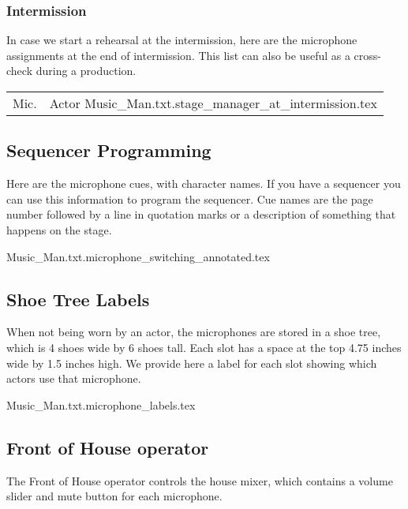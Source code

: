 \documentclass[letterpaper]{article}
\begin{document}
\subsubsection {Intermission}

In case we start a rehearsal at the intermission, here are the microphone
assignments at the end of intermission.  This list can also be useful as a 
cross-check during a production.

\begin{center}
\begin{longtable}{|l|l|}
\hline Mic. & Actor \endhead \hline
 {Music_Man.txt.stage_manager_at_intermission.tex}
\end{longtable}
\end{center}

\subsection {Sequencer Programming}

Here are the microphone cues, with character names.  If you
have a sequencer you can use this information to program
the sequencer.  Cue names are the page number followed by a line
in quotation marks or a description of something that happens on
the stage.

 {Music_Man.txt.microphone_switching_annotated.tex}

\subsection {Shoe Tree Labels}

When not being worn by an actor, the microphones are stored in a shoe tree,
which is 4 shoes wide by 6 shoes tall.  
Each slot has a space at the top 4.75 inches wide
by 1.5 inches high.  We provide here a label for each slot showing which
actors use that microphone.

{\Large
 {Music_Man.txt.microphone_labels.tex}
}

\subsection {Front of House operator}

The Front of House operator controls the house mixer, 
which contains a volume slider
and mute button for each microphone.  
\end{document}
